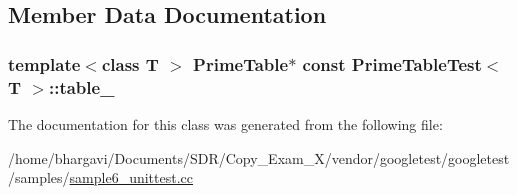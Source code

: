 \subsection{Member Data Documentation}
\subsubsection[{\texorpdfstring{table\+\_\+}{table_}}]{\setlength{\rightskip}{0pt plus 5cm}template$<$class T $>$ {\bf Prime\+Table}$\ast$ const {\bf Prime\+Table\+Test}$<$ T $>$\+::table\+\_\+\hspace{0.3cm}{\ttfamily [protected]}}\hypertarget{class_prime_table_test_a86da90fc6d5cef6386d0cd8fb52b4046}{}\label{class_prime_table_test_a86da90fc6d5cef6386d0cd8fb52b4046}


The documentation for this class was generated from the following file\+:\begin{DoxyCompactItemize}
\item 
/home/bhargavi/\+Documents/\+S\+D\+R/\+Copy\+\_\+\+Exam\+\_\+X/vendor/googletest/googletest/samples/\hyperlink{sample6__unittest_8cc}{sample6\+\_\+unittest.\+cc}\end{DoxyCompactItemize}
